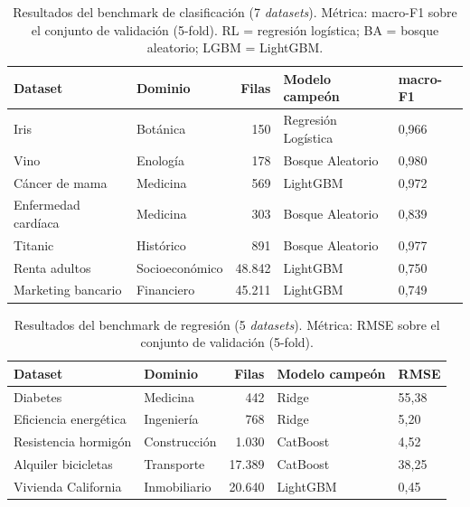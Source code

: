 \begin{table}[H]
\centering
\caption{Resultados del benchmark de clasificación (7 \textit{datasets}).
 Métrica: macro-F1 sobre el conjunto de validación (5-fold).
 RL = regresión logística; BA = bosque aleatorio; LGBM = LightGBM.}
\label{tab:pool-classification}
\small
\begin{tabular}{llrll}
\toprule
\textbf{Dataset} & \textbf{Dominio} & \textbf{Filas} & \textbf{Modelo campeón} & \textbf{macro-F1} \\
\midrule
Iris                  & Botánica           &     150 & Regresión Logística & 0,966 \\
Vino                  & Enología           &     178 & Bosque Aleatorio    & 0,980 \\
Cáncer de mama        & Medicina           &     569 & LightGBM            & 0,972 \\
Enfermedad cardíaca   & Medicina           &     303 & Bosque Aleatorio    & 0,839 \\
Titanic               & Histórico          &     891 & Bosque Aleatorio    & 0,977 \\
Renta adultos         & Socioeconómico     & 48.842  & LightGBM            & 0,750 \\
Marketing bancario    & Financiero         & 45.211  & LightGBM            & 0,749 \\
\bottomrule
\end{tabular}
\end{table}

\begin{table}[H]
\centering
\caption{Resultados del benchmark de regresión (5 \textit{datasets}).
 Métrica: RMSE sobre el conjunto de validación (5-fold).}
\label{tab:pool-regression}
\small
\begin{tabular}{llrll}
\toprule
\textbf{Dataset} & \textbf{Dominio} & \textbf{Filas} & \textbf{Modelo campeón} & \textbf{RMSE} \\
\midrule
Diabetes              & Medicina           &     442 & Ridge     & 55,38 \\
Eficiencia energética & Ingeniería         &     768 & Ridge     &  5,20 \\
Resistencia hormigón  & Construcción       &   1.030 & CatBoost  &  4,52 \\
Alquiler bicicletas   & Transporte         & 17.389  & CatBoost  & 38,25 \\
Vivienda California   & Inmobiliario       & 20.640  & LightGBM  &  0,45 \\
\bottomrule
\end{tabular}
\end{table}

